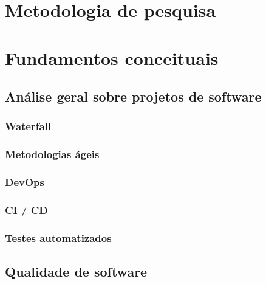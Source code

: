 \documentclass[]{../class/politex}
\begin{document}
  \capa
  \falsafolhaderosto
  \folhaderosto

  \sumario

  \begin{resumo}
  \end{resumo}

  \begin{abstract}
  \end{abstract}

  

  \chapter{Metodologia de pesquisa}

  

  \chapter{Fundamentos conceituais}

    \section{Análise geral sobre projetos de software}

      \subsection{Waterfall}

      \subsection{Metodologias ágeis}

      \subsection{DevOps}

      \subsection{CI / CD}

      \subsection{Testes automatizados}

    \section{Qualidade de software}
\end{document}
